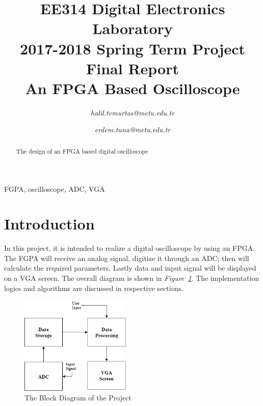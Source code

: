 \documentclass[paper]{IEEEtran}
\begin{document}
	
	\title{EE314 Digital Electronics Laboratory\\
		2017-2018 Spring Term Project Final Report\\
		An FPGA Based Oscilloscope
	}
	
	
	\author{
		
		\textit{halil.temurtas@metu.edu.tr}
		
		\and
		
		\textit{erdem.tuna@metu.edu.tr}
		
		
	}
	
	\maketitle
	
	\begin{abstract}
		
		The design of an FPGA based digital oscilloscope 
		
	\end{abstract}
	
	\begin{IEEEkeywords}
		FGPA, oscilloscope, ADC, VGA
	\end{IEEEkeywords}
	
	\section{Introduction}
	\- \indent
	In this project, it is intended to realize a digital oscilloscope by using an FPGA. The FGPA will receive an analog signal, digitize it through an ADC; then will calculate the required parameters. Lastly data and input signal will be displayed on a VGA screen. The overall diagram is shown in \textit{Figure~\ref{fig:overall_diagram}}. The implementation logics and algorithms are discussed in respective sections.
	
	\begin{figure}[h!]
		\setlength{\unitlength}{\textwidth}
		\center 
		\includegraphics[width=0.47\textwidth]{overall_diagram}
		\caption{\label{fig:overall_diagram}The Block Diagram of the Project}
	\end{figure}
	
\end{document}

